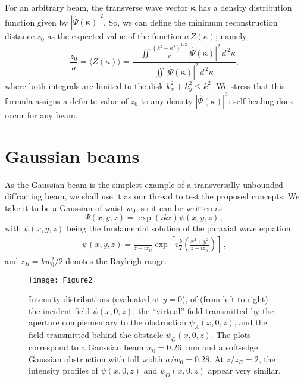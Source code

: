 \documentclass[10pt]{article}
\newcommand{\vka}{\bm{\kappa}}
\newcommand{\dd}{{d^{\,2}}}
\begin{document}
For an arbitrary beam,  the transverse wave vector $\vka$ has a
density distribution function given by $| \widehat{\Psi} (\vka) |^2$. So, we can
define the minimum reconstruction distance $z_0$  as the expected
value of the function $a \, Z(\kappa)$; namely, 
\begin{equation}
  \label{z40}
  \frac{z_0}{a} = \langle Z(\kappa) \rangle =  
  \frac{\phantom{ix} \displaystyle{
 \iint \frac{\left( k^2 - \kappa^2 \right)^{1/2}}{\kappa}
 |\widehat{\Psi} (\vka)|^2\, \dd \kappa}}
  {\displaystyle{\iint  |\widehat{\Psi} (\vka)|^2 \, \dd \kappa }},
\end{equation}
where both integrals are limited to the disk  $k_x^2 + k_y^2 \leq
k^2$.  We stress that this  formula assigns a definite value of $z_{0}$
to any density  $| \widehat{\Psi} (\vka) |^2$:  self-healing does
occur for any beam.

\section{Gaussian beams}

As the Gaussian beam is the simplest example of a transversally
unbounded diffracting beam, we shall use it as our thread to test the
proposed concepts. We take it to be a Gaussian of waist $w_0$, so it
can be written as
\begin{equation}
\Psi(x,y,z) = \exp ( i k z ) \psi (x,y,z) \, ,
\end{equation}  
with $\psi (x,y,z)$ being the fundamental solution of the paraxial
wave equation: 
\begin{align}
  \label{z120}
  \psi(x,y,z) = \frac{1}{z - i z_R} 
  \exp\left[ 
  i \frac{k}{2} \left(\frac{ x^2 + y^2}{z - i z_R}
  \right)\right] \, ,
\end{align}
and $z_R = k w_0^2/2$ denotes the Rayleigh range. 

\begin{figure*}[t]
  \centerline{\texttt{[image: Figure2]}}
  \caption{ \label{fig2} Intensity distributions (evaluated at $y=0$),
    of (from left to right): the incident field $\psi (x,0,z)$, the
    ``virtual'' field transmitted by the aperture complementary to the
    obstruction $\psi_A(x,0,z)$, and the field transmitted behind the
    obstacle $\psi_O(x,0,z)$. The plots correspond to a Gaussian beam
    $w_{0} = 0.26$~mm and a soft-edge Gaussian obstruction with full
    width $a/w_0 = 0.28$.  At   $z/z_{R} = 2$, the intensity profiles
    of  $\psi (x,0,z)$  and $\psi_O(x,0,z)$ appear very similar.}
\end{figure*}
\end{document}
